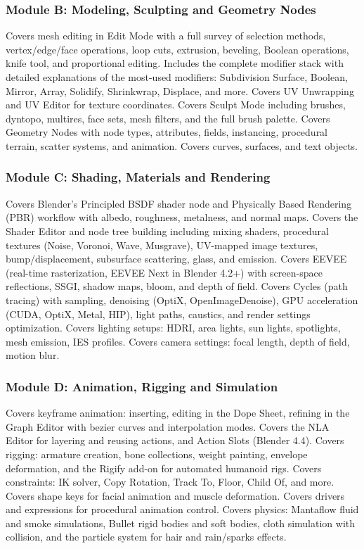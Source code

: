 \documentclass[11pt,letterpaper]{article}
\begin{document}
\subsubsection{Module B: Modeling, Sculpting and Geometry Nodes}

Covers mesh editing in Edit Mode with a full survey of selection methods, vertex/edge/face operations, loop cuts, extrusion, beveling, Boolean operations, knife tool, and proportional editing. Includes the complete modifier stack with detailed explanations of the most-used modifiers: Subdivision Surface, Boolean, Mirror, Array, Solidify, Shrinkwrap, Displace, and more. Covers UV Unwrapping and UV Editor for texture coordinates. Covers Sculpt Mode including brushes, dyntopo, multires, face sets, mesh filters, and the full brush palette. Covers Geometry Nodes with node types, attributes, fields, instancing, procedural terrain, scatter systems, and animation. Covers curves, surfaces, and text objects.

\subsubsection{Module C: Shading, Materials and Rendering}

Covers Blender's Principled BSDF shader node and Physically Based Rendering (PBR) workflow with albedo, roughness, metalness, and normal maps. Covers the Shader Editor and node tree building including mixing shaders, procedural textures (Noise, Voronoi, Wave, Musgrave), UV-mapped image textures, bump/displacement, subsurface scattering, glass, and emission. Covers EEVEE (real-time rasterization, EEVEE Next in Blender 4.2+) with screen-space reflections, SSGI, shadow maps, bloom, and depth of field. Covers Cycles (path tracing) with sampling, denoising (OptiX, OpenImageDenoise), GPU acceleration (CUDA, OptiX, Metal, HIP), light paths, caustics, and render settings optimization. Covers lighting setups: HDRI, area lights, sun lights, spotlights, mesh emission, IES profiles. Covers camera settings: focal length, depth of field, motion blur.

\subsubsection{Module D: Animation, Rigging and Simulation}

Covers keyframe animation: inserting, editing in the Dope Sheet, refining in the Graph Editor with bezier curves and interpolation modes. Covers the NLA Editor for layering and reusing actions, and Action Slots (Blender 4.4). Covers rigging: armature creation, bone collections, weight painting, envelope deformation, and the Rigify add-on for automated humanoid rigs. Covers constraints: IK solver, Copy Rotation, Track To, Floor, Child Of, and more. Covers shape keys for facial animation and muscle deformation. Covers drivers and expressions for procedural animation control. Covers physics: Mantaflow fluid and smoke simulations, Bullet rigid bodies and soft bodies, cloth simulation with collision, and the particle system for hair and rain/sparks effects.
\end{document}
